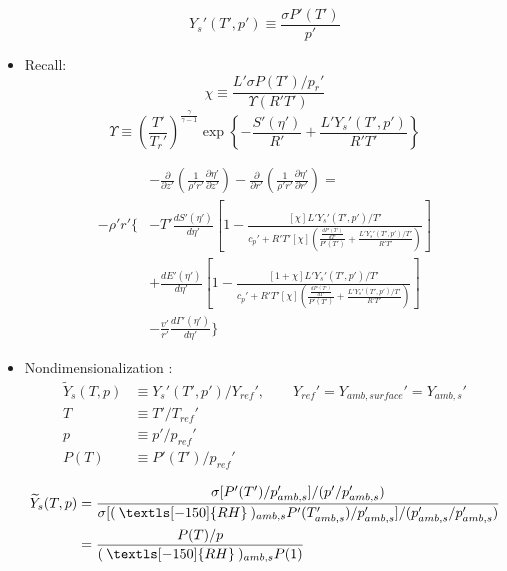 \documentclass[preprint, prX]{revtex4}
\newcommand{\pfrac}[2]{\left(\frac{#1}{#2}\right)}
\newcommand{\dd}[2]{\frac{d#1}{d#2}}
\newcommand{\pd}[2]{\frac{\partial#1}{\partial#2}}
\newcommand{\gogmo}{\frac{\gamma}{\gamma-1}}
\newcommand{\rh}{\:\textls[-150]{RH}\:}
\begin{document}
\begin{itemize}
\begin{equation}
Y_s'(T',p') \equiv \frac{\sigma P'(T')}{p'}
\end{equation}

\item
Recall:
\begin{equation}
\chi \equiv \frac{L'\sigma P(T')/p_r'}{\Upsilon(R' T')} 
\end{equation}
\begin{equation}
\Upsilon \equiv \pfrac{T'}{T_r'}^\gogmo \exp \left\{ -\frac{S'(\eta')}{R'} +\frac{L'Y_s'(T',p')}{R' T'} \right\}
\end{equation}

\begin{equation}
\begin{split}
&-\pd{}{z'}\left( \frac{1}{\rho' r'} \pd{\eta'}{z'}\right) - \pd{}{r'}\left(\frac{1}{\rho'r'} \pd{\eta'}{r'}\right) =\\
-\rho'r' \Bigg\{ &-T' \dd{S'(\eta')}{\eta'} \left[ 1 - \frac{[\chi] L'Y_s'(T',p')/T'}{c_p' + R'T'[\chi] \left( \frac{\dd{P'(T')}{T'}}{P'(T')} +\frac{L'Y_s'(T',p')/T'}{R'T'} \right)}\right]  \\
& + \dd{E'(\eta')}{\eta'} \left[1 - \frac{[1+\chi] L'Y_s'(T',p')/T'}{c_p' + R'T'[\chi] \left( \frac{\dd{P'(T')}{T'}}{P'(T')} +\frac{L'Y_s'(T',p')/T'}{R'T'} \right)} \right]  \\
&- \frac{v'}{r'}\dd{\Gamma'(\eta')}{\eta'} \Bigg\}
\end{split}
\end{equation}

\item
Nondimensionalization :
\begin{equation}
\begin{split}
\widetilde{Y}_s(T,p) &\equiv Y_s'(T',p') / Y_{ref}',  \qquad Y_{ref}' = Y_{amb,surface}' = Y_{amb,s}'\\
T &\equiv T'/T_{ref}' \\
p &\equiv p'/p_{ref}' \\
P(T) &\equiv P'(T') / p_{ref}'
\end{split}
\end{equation}

\begin{equation}
\begin{split}
\widetilde{Y}_s(T,p) &= \frac{\sigma[P'(T')/p_{amb,s}' ]/(p'/p_{amb,s}')}{\sigma[(\rh)_{amb,s} P'(T_{amb,s}')/p_{amb,s}']/(p_{amb,s}'/p_{amb,s}')} \\
&= \frac{P(T)/p}{(\rh)_{amb,s}P(1)}\\
\end{split}
\end{equation}


\end{itemize}
\end{document}
